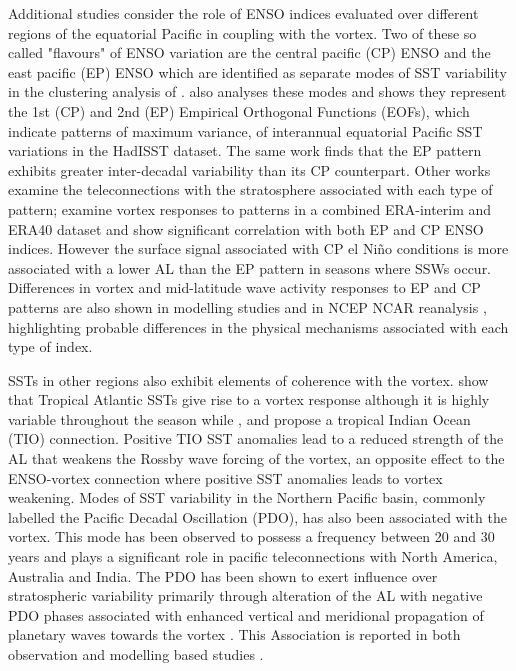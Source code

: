 {Additional studies consider the role of ENSO indices evaluated over different regions of the equatorial Pacific in coupling with the vortex. Two of these so called  "flavours" of ENSO variation are the central pacific (CP) ENSO and the east pacific (EP) ENSO which are identified as separate modes of SST variability in the clustering analysis of \cite{johnsonHow2013}. \cite{kaoContrasting2009} also analyses these modes and shows they represent the 1st (CP) and 2nd (EP) Empirical Orthogonal Functions (EOFs), which indicate patterns of maximum variance, of interannual equatorial Pacific SST variations in the HadISST dataset. The same work finds that the EP pattern exhibits greater inter-decadal variability than its CP counterpart. Other works examine the teleconnections with the stratosphere associated with each type of pattern; \cite{izaRole2015} examine vortex responses to patterns in a combined ERA-interim and ERA40 dataset and show significant correlation with both EP and CP ENSO indices. However the surface signal associated with CP el Ni\~{n}o conditions is more associated with a lower AL than the EP pattern in seasons where SSWs occur. Differences in vortex and mid-latitude wave activity responses to EP and CP patterns are also shown in modelling studies \citep{hegyiDynamical2011} and in NCEP NCAR reanalysis \citep{sungAltered2014}, highlighting probable differences in the physical mechanisms associated with each type of index. 

SSTs in other regions also exhibit elements of coherence with the vortex. \cite{raoVarying2018} show that Tropical Atlantic SSTs give rise to a vortex response although it is highly variable throughout the season while \cite{fletcherRole2011}, \cite{fletcherLinear2013} and \cite{raoDecomposition2016} propose a tropical Indian Ocean (TIO) connection. Positive TIO SST anomalies lead to a reduced strength of the AL that weakens the Rossby wave forcing of the vortex, an opposite effect to the ENSO-vortex connection where positive SST anomalies leads to vortex weakening. Modes of SST variability in the Northern Pacific basin, commonly labelled the Pacific Decadal Oscillation (PDO), has also been associated with the vortex. This mode has been observed to possess a frequency between 20 and 30 years \citep{henleyTripole2015} and plays a significant role in pacific teleconnections with North America, Australia and India. The PDO has been shown to exert influence over stratospheric variability primarily through alteration of the AL with negative PDO phases associated with enhanced vertical and meridional propagation of planetary waves towards the vortex \citep{mantuaPacific1997, rodionovSpatial2005,raoModulation2019}. This Association is reported in both observation and modelling based studies \citep{garcia-herreraPropagation2006, krenWintertime2016, huDecadal2018}.

}
